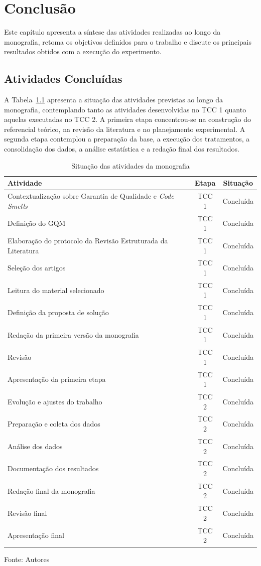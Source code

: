 \chapter[Conclusão]{Conclusão}

Este capítulo apresenta a síntese das atividades realizadas ao longo da monografia, retoma os objetivos definidos para 
o trabalho e discute os principais resultados obtidos com a execução do experimento.

\section{Atividades Concluídas}

A Tabela~\ref{tab:atividades_conclusao} apresenta a situação das atividades previstas ao longo da monografia, 
contemplando tanto as atividades desenvolvidas no TCC 1 quanto aquelas executadas no TCC 2. A primeira etapa 
concentrou-se na construção do referencial teórico, na revisão da literatura e no planejamento experimental. 
A segunda etapa contemplou a preparação da base, a execução dos tratamentos, a consolidação dos dados, a análise 
estatística e a redação final dos resultados.

\begin{table}[h!]
\centering
\caption{Situação das atividades da monografia}
\label{tab:atividades_conclusao}
\begin{tabular}{lcc}
\hline
\textbf{Atividade} & \textbf{Etapa} & \textbf{Situação} \\
\hline
Contextualização sobre Garantia de Qualidade e \textit{Code Smells} & TCC 1 & Concluída \\
Definição do GQM & TCC 1 & Concluída \\
Elaboração do protocolo da Revisão Estruturada da Literatura & TCC 1 & Concluída \\
Seleção dos artigos & TCC 1 & Concluída \\
Leitura do material selecionado & TCC 1 & Concluída \\
Definição da proposta de solução & TCC 1 & Concluída \\
Redação da primeira versão da monografia & TCC 1 & Concluída \\
Revisão & TCC 1 & Concluída \\
Apresentação da primeira etapa & TCC 1 & Concluída \\
\hline
Evolução e ajustes do trabalho & TCC 2 & Concluída \\
Preparação e coleta dos dados & TCC 2 & Concluída \\
Análise dos dados & TCC 2 & Concluída \\
Documentação dos resultados & TCC 2 & Concluída \\
Redação final da monografia & TCC 2 & Concluída \\
Revisão final & TCC 2 & Concluída \\
Apresentação final & TCC 2 & Concluída \\
\hline
\end{tabular}
Fonte: Autores
\end{table}

